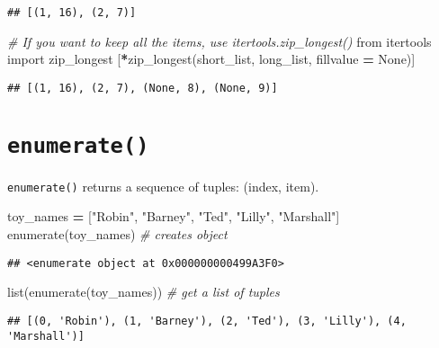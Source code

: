 \documentclass[
]{book}
\newenvironment{Shaded}{\begin{snugshade}}{\end{snugshade}}
\newcommand{\BuiltInTok}[1]{#1}
\newcommand{\CommentTok}[1]{\textcolor[rgb]{0.56,0.35,0.01}{\textit{#1}}}
\newcommand{\ImportTok}[1]{#1}
\newcommand{\NormalTok}[1]{#1}
\newcommand{\OperatorTok}[1]{\textcolor[rgb]{0.81,0.36,0.00}{\textbf{#1}}}
\newcommand{\StringTok}[1]{\textcolor[rgb]{0.31,0.60,0.02}{#1}}
\newcommand{\VariableTok}[1]{\textcolor[rgb]{0.00,0.00,0.00}{#1}}
\begin{document}
\begin{verbatim}
## [(1, 16), (2, 7)]
\end{verbatim}

\begin{Shaded}
\begin{Highlighting}[]
\CommentTok{\# If you want to keep all the items, use itertools.zip\_longest()}
\ImportTok{from}\NormalTok{ itertools }\ImportTok{import}\NormalTok{ zip\_longest}
\NormalTok{[}\OperatorTok{*}\NormalTok{zip\_longest(short\_list, long\_list, fillvalue }\OperatorTok{=} \VariableTok{None}\NormalTok{)]}
\end{Highlighting}
\end{Shaded}

\begin{verbatim}
## [(1, 16), (2, 7), (None, 8), (None, 9)]
\end{verbatim}

\hypertarget{enumerate}{%
\section{\texorpdfstring{\texttt{enumerate()}}{enumerate()}}\label{enumerate}}

\texttt{enumerate()} returns a sequence of tuples: (index, item).

\begin{Shaded}
\begin{Highlighting}[]
\NormalTok{toy\_names }\OperatorTok{=}\NormalTok{ [}\StringTok{"Robin"}\NormalTok{, }\StringTok{"Barney"}\NormalTok{, }\StringTok{"Ted"}\NormalTok{, }\StringTok{"Lilly"}\NormalTok{, }\StringTok{"Marshall"}\NormalTok{]}
\BuiltInTok{enumerate}\NormalTok{(toy\_names) }\CommentTok{\# creates object}
\end{Highlighting}
\end{Shaded}

\begin{verbatim}
## <enumerate object at 0x000000000499A3F0>
\end{verbatim}

\begin{Shaded}
\begin{Highlighting}[]
\BuiltInTok{list}\NormalTok{(}\BuiltInTok{enumerate}\NormalTok{(toy\_names)) }\CommentTok{\# get a list of tuples}
\end{Highlighting}
\end{Shaded}

\begin{verbatim}
## [(0, 'Robin'), (1, 'Barney'), (2, 'Ted'), (3, 'Lilly'), (4, 'Marshall')]
\end{verbatim}
\end{document}
